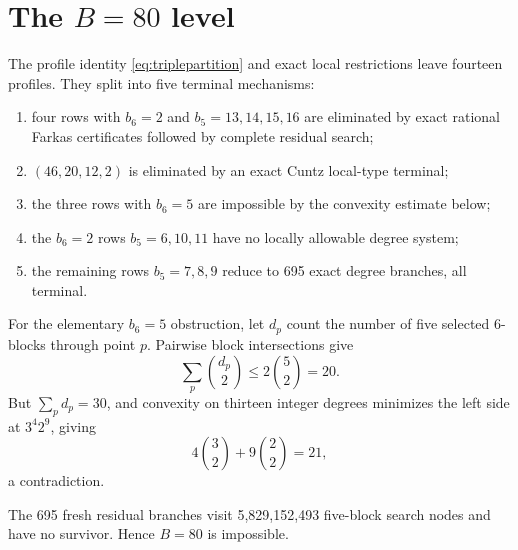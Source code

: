 \section{The $B=80$ level}

The profile identity \cref{eq:triplepartition} and exact local restrictions leave fourteen profiles.  They split into five terminal mechanisms:
\begin{enumerate}
\item four rows with $b_6=2$ and $b_5=13,14,15,16$ are eliminated by exact rational Farkas certificates followed by complete residual search;
\item $(46,20,12,2)$ is eliminated by an exact Cuntz local-type terminal;
\item the three rows with $b_6=5$ are impossible by the convexity estimate below;
\item the $b_6=2$ rows $b_5=6,10,11$ have no locally allowable degree system;
\item the remaining rows $b_5=7,8,9$ reduce to 695 exact degree branches, all terminal.
\end{enumerate}

For the elementary $b_6=5$ obstruction, let $d_p$ count the number of five selected 6-blocks through point $p$.  Pairwise block intersections give
\[
 \sum_p\binom{d_p}{2}\le 2\binom52=20.
\]
But $\sum_p d_p=30$, and convexity on thirteen integer degrees minimizes the left side at $3^4 2^9$, giving
\[
 4\binom32+9\binom22=21,
\]
a contradiction.

The 695 fresh residual branches visit 5,829,152,493 five-block search nodes and have no survivor.  Hence $B=80$ is impossible.

